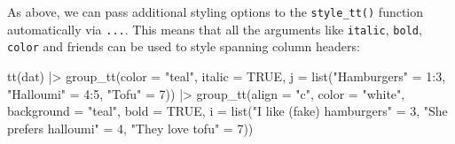 \documentclass[
  letterpaper,
  DIV=11,
  numbers=noendperiod]{scrartcl}
\newenvironment{Shaded}{\begin{snugshade}}{\end{snugshade}}
\newcommand{\AttributeTok}[1]{\textcolor[rgb]{0.40,0.45,0.13}{#1}}
\newcommand{\ConstantTok}[1]{\textcolor[rgb]{0.56,0.35,0.01}{#1}}
\newcommand{\DecValTok}[1]{\textcolor[rgb]{0.68,0.00,0.00}{#1}}
\newcommand{\FunctionTok}[1]{\textcolor[rgb]{0.28,0.35,0.67}{#1}}
\newcommand{\NormalTok}[1]{\textcolor[rgb]{0.00,0.23,0.31}{#1}}
\newcommand{\OtherTok}[1]{\textcolor[rgb]{0.00,0.23,0.31}{#1}}
\newcommand{\SpecialCharTok}[1]{\textcolor[rgb]{0.37,0.37,0.37}{#1}}
\newcommand{\StringTok}[1]{\textcolor[rgb]{0.13,0.47,0.30}{#1}}
\begin{document}
As above, we can pass additional styling options to the
\texttt{style\_tt()} function automatically via \texttt{...}. This means
that all the arguments like \texttt{italic}, \texttt{bold},
\texttt{color} and friends can be used to style spanning column headers:

\begin{Shaded}
\begin{Highlighting}[]
\FunctionTok{tt}\NormalTok{(dat) }\SpecialCharTok{|\textgreater{}} 
  \FunctionTok{group\_tt}\NormalTok{(}\AttributeTok{color =} \StringTok{"teal"}\NormalTok{, }\AttributeTok{italic =} \ConstantTok{TRUE}\NormalTok{,}
    \AttributeTok{j =} \FunctionTok{list}\NormalTok{(}\StringTok{"Hamburgers"} \OtherTok{=} \DecValTok{1}\SpecialCharTok{:}\DecValTok{3}\NormalTok{,}
             \StringTok{"Halloumi"} \OtherTok{=} \DecValTok{4}\SpecialCharTok{:}\DecValTok{5}\NormalTok{,}
             \StringTok{"Tofu"} \OtherTok{=} \DecValTok{7}\NormalTok{)) }\SpecialCharTok{|\textgreater{}}
  \FunctionTok{group\_tt}\NormalTok{(}\AttributeTok{align =} \StringTok{"c"}\NormalTok{, }\AttributeTok{color =} \StringTok{"white"}\NormalTok{, }\AttributeTok{background =} \StringTok{"teal"}\NormalTok{, }\AttributeTok{bold =} \ConstantTok{TRUE}\NormalTok{,}
    \AttributeTok{i =} \FunctionTok{list}\NormalTok{(}\StringTok{"I like (fake) hamburgers"} \OtherTok{=} \DecValTok{3}\NormalTok{,}
             \StringTok{"She prefers halloumi"} \OtherTok{=} \DecValTok{4}\NormalTok{,}
             \StringTok{"They love tofu"} \OtherTok{=} \DecValTok{7}\NormalTok{))}
\end{Highlighting}
\end{Shaded}
\end{document}
